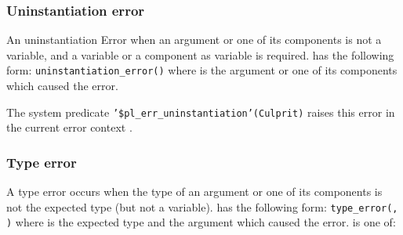 \subsubsection{Uninstantiation error}
\label{Uninstantiation-error}
An uninstantiation Error when an argument or one of its components is not a
variable, and a variable or a component as variable is required.
 has the following form:
\texttt{uninstantiation\_error()} where  is the argument or one
of its components which caused the error.

The system predicate \texttt{'\$pl\_err\_uninstantiation'(Culprit)} raises this
error in the current error context .

\subsubsection{Type error}
\label{Type-error}
A type error occurs when the type of an argument or one of its components is
not the expected type (but not a variable).  has
the following form: \texttt{type\_error(, )} where
 is the expected type and 
the argument which caused the error.  is one of:

